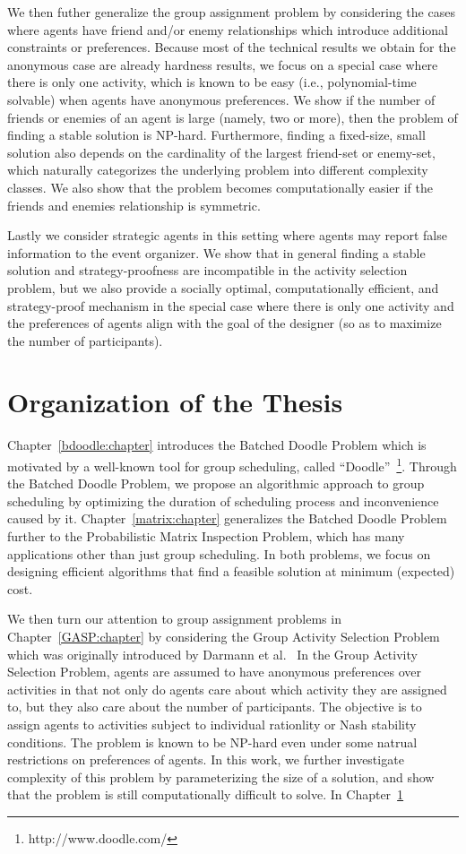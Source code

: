 We then futher generalize the group assignment problem by considering the cases where agents have friend and/or enemy relationships which introduce additional constraints or preferences. Because most of the technical results we obtain for the anonymous case are already hardness results, we focus on a special case where there is only one activity, which is known to be easy (i.e., polynomial-time solvable) when agents have anonymous preferences. We show if the number of friends or enemies of an agent is large (namely, two or more), then the problem of finding a stable solution is NP-hard. Furthermore, finding a fixed-size, small solution also depends on the cardinality of the largest friend-set or enemy-set, which naturally categorizes the underlying problem into different complexity classes. We also show that the problem becomes computationally easier if the friends and enemies relationship is symmetric.

Lastly we consider strategic agents in this setting where agents may report false information to the event organizer. We show that in general finding a stable solution and strategy-proofness are incompatible in the activity selection problem, but we also provide a socially optimal, computationally efficient, and strategy-proof mechanism in the special case where there is only one activity and the preferences of agents align with the goal of the designer (so as to maximize the number of participants).


\section{Organization of the Thesis}
Chapter~\ref{bdoodle:chapter} introduces the Batched Doodle Problem which is motivated by a well-known tool for group scheduling, called ``Doodle''~\footnote{http://www.doodle.com/}. Through the Batched Doodle Problem, we propose an algorithmic approach to group scheduling by optimizing the duration of scheduling process and inconvenience caused by it. Chapter~\ref{matrix:chapter} generalizes the Batched Doodle Problem further to the Probabilistic Matrix Inspection Problem, which has many applications other than just group scheduling. In both problems, we focus on designing efficient algorithms that find a feasible solution at minimum (expected) cost. 

We then turn our attention to group assignment problems in Chapter~\ref{GASP:chapter} by considering the Group Activity Selection Problem which was originally introduced by Darmann et al.~\cite{GASP12WINE} In the Group Activity Selection Problem, agents are assumed to have anonymous preferences over activities in that not only do agents care about which activity they are assigned to, but they also care about the number of participants. The objective is to assign agents to activities subject to individual rationlity or Nash stability conditions. The problem is known to be NP-hard even under some natrual restrictions on preferences of agents. In this work, we further investigate complexity of this problem by parameterizing the size of a solution, and show that the problem is still computationally difficult to solve. In Chapter~\ref{}



